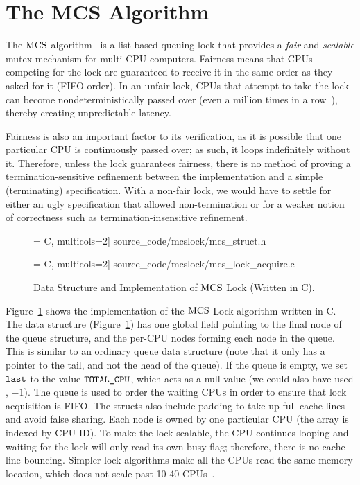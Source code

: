 \section{The MCS Algorithm}
\label{chapter:mcslock:sec:overview}

The $\mathrm{MCS}$ algorithm~\cite{mcs91} is a list-based queuing lock that provides a \textit{fair} and \textit{scalable} mutex mechanism for multi-CPU computers. Fairness means that CPUs competing for the lock are guaranteed to receive it in the same order as they asked for it (FIFO order).
In  an unfair lock, CPUs
that attempt to take the lock can become nondeterministically passed over (even a million times in a row~\cite{lwn:ticketlocks}), thereby creating unpredictable latency.

Fairness is also an important factor to its verification, as it is possible that one particular CPU is continuously passed over; 
as such, it loops indefinitely without it. 
Therefore, unless the lock guarantees fairness, there is no method of proving a termination-sensitive refinement between the implementation and a simple (terminating) specification. 
With a non-fair lock, we would have to settle for either an ugly specification that allowed non-termination or for a weaker notion of correctness such as termination-insensitive refinement.
\begin{figure}
 = C, multicols=2] {source_code/mcslock/mcs_struct.h}
\vspace{1em}

 = C, multicols=2] {source_code/mcslock/mcs_lock_acquire.c}
\caption{Data Structure and Implementation of $\mathrm{MCS}$ Lock (Written in C).}
\label{fig:chapter:mcslock:mcs_lock}
\end{figure}

Figure~\ref{fig:chapter:mcslock:mcs_lock} shows the implementation of the $\mathrm{MCS}$ Lock algorithm written in C. 
The data structure  (Figure~\ref{fig:chapter:mcslock:mcs_lock})
has one global field pointing to the final node of the queue structure, and the 
per-CPU nodes forming each node in the queue. This is similar to an ordinary queue data structure (note that it only has a pointer to the tail, and not the head of the queue).
If the queue is empty, we set ${\mathrm{\texttt{last}}}$ to the value ${\mathrm{\texttt{TOTAL\_CPU}}}$, which acts as a null value (we could also have used \eg, $-1$). 
The queue is used to order the waiting CPUs in order to ensure that lock acquisition is FIFO. 
The structs also include padding to take up full cache lines and avoid false sharing. 
Each node is owned by one particular CPU (the array is indexed by CPU ID). 
To make the lock scalable, the CPU continues looping and waiting for the lock will only read its own busy flag; 
therefore, there is no cache-line bouncing. 
Simpler lock algorithms make all the CPUs read the same memory location, which does not scale past 10-40 CPUs~\cite{Boyd-wickizer12}.


